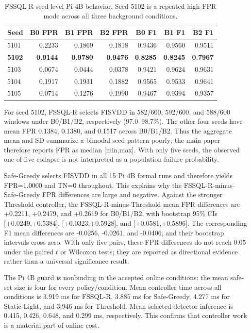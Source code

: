 \documentclass[10pt,journal]{IEEEtran}
\begin{document}
\begin{table}[h]
\caption{FSSQL-R seed-level Pi 4B behavior. Seed 5102 is a repeated high-FPR mode across all three background conditions.}
\centering\scriptsize
\setlength{\tabcolsep}{5pt}
\begin{tabular}{lrrrrrr}
\toprule
Seed & B0 FPR & B1 FPR & B2 FPR & B0 F1 & B1 F1 & B2 F1 \\
\midrule
5101 & 0.2233 & 0.1869 & 0.1818 & 0.9436 & 0.9560 & 0.9511 \\
\textbf{5102} & \textbf{0.9144} & \textbf{0.9780} & \textbf{0.9476} & \textbf{0.8285} & \textbf{0.8245} & \textbf{0.7967} \\
5103 & 0.0674 & 0.0444 & 0.0378 & 0.9421 & 0.9624 & 0.9631 \\
5104 & 0.1917 & 0.1931 & 0.1882 & 0.9565 & 0.9533 & 0.9641 \\
5105 & 0.0714 & 0.1276 & 0.1990 & 0.9467 & 0.9394 & 0.9357 \\
\bottomrule
\end{tabular}
\end{table}

For seed 5102, FSSQL-R selects FISVDD in 582/600, 592/600, and 588/600 windows under B0/B1/B2, respectively (97.0--98.7\%). The other four seeds have mean FPR 0.1384, 0.1380, and 0.1517 across B0/B1/B2. Thus the aggregate mean and SD summarize a bimodal seed pattern poorly; the main paper therefore reports FPR as median [min,max]. With only five seeds, the observed one-of-five collapse is not interpreted as a population failure probability.

Safe-Greedy selects FISVDD in all 15 Pi 4B formal runs and therefore yields FPR=1.0000 and TN=0 throughout. This explains why the FSSQL-R-minus-Safe-Greedy FPR differences are large and negative. Against the stronger Threshold controller, the FSSQL-R-minus-Threshold mean FPR differences are +0.2211, +0.2479, and +0.2619 for B0/B1/B2, with bootstrap 95\% CIs [+0.0249,+0.5384], [+0.0323,+0.5928], and [+0.0581,+0.5896]. The corresponding F1 mean differences are -0.0256, -0.0261, and -0.0406, and their bootstrap intervals cross zero. With only five pairs, these FPR differences do not reach 0.05 under the paired $t$ or Wilcoxon tests; they are reported as directional evidence rather than a universal significance result.

The Pi 4B guard is nonbinding in the accepted online conditions: the mean safe-set size is four for every policy/condition. Mean controller time across all conditions is 3.919 ms for FSSQL-R, 3.885 ms for Safe-Greedy, 4.277 ms for Static-Light, and 3.946 ms for Threshold. Mean selected-detector inference is 0.415, 0.426, 0.648, and 0.299 ms, respectively. This confirms that controller work is a material part of online cost.
\end{document}
